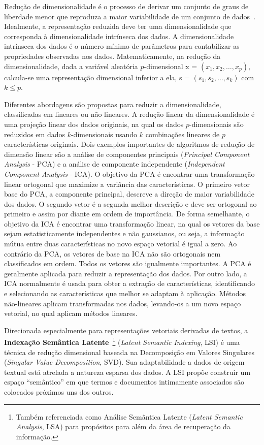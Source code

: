 \documentclass{SBCbookchapter}
\begin{document}
Redução de dimensionalidade é o processo de derivar um conjunto de graus de liberdade menor que reproduza a maior variabilidade de um conjunto de dados~\cite{zhai2014emerging,AndreoniLopez2019}. Idealmente, a representação reduzida deve ter uma dimensionalidade que corresponda à dimensionalidade intrínseca dos dados. A dimensionalidade intrínseca dos dados é o número mínimo de parâmetros para contabilizar as propriedades observadas nos dados. Matematicamente, na redução da dimensionalidade, dada a variável aleatória $p$-dimensional x = $ (x_1, x_2, \ldots, x_p) $, calcula-se uma representação dimensional inferior a ela, s = $ (s_1, s_2, \ldots, s_k) $ com $ k \leq p $.

Diferentes abordagens são propostas para reduzir a dimensionalidade, classificadas em lineares ou não lineares. A redução linear da dimensionalidade é uma projeção linear dos dados originais, na qual os dados $p$-dimensionais são reduzidos em dados $k$-dimensionais usando $k$ combinações lineares de $p$ características originais. Dois exemplos importantes de algoritmos de redução de dimensão linear são a análise de componentes principais (\textit{Principal Component Analysis} - PCA) e a análise de componente independente (\textit{Independent Component Analysis} - ICA). O objetivo da PCA é encontrar uma transformação linear ortogonal que maximize a variância das características. O primeiro vetor base do PCA, a componente principal, descreve a direção de maior variabilidade dos dados. O segundo vetor é a segunda melhor descrição e deve ser ortogonal ao primeiro e assim por diante em ordem de importância. De forma semelhante, o objetivo da ICA é encontrar uma transformação linear, na qual os vetores da base sejam estatisticamente independentes e não gaussianos, ou seja, a informação mútua entre duas características no novo espaço vetorial é igual a zero. Ao contrário da PCA, os vetores de base na ICA não são ortogonais nem classificados em ordem. Todos os vetores são igualmente importantes. A PCA é geralmente aplicada para reduzir a representação dos dados. Por outro lado, a ICA normalmente é usada para obter a extração de características, identificando e selecionando as características que melhor se adaptam à aplicação. Métodos não-lineares aplicam transformadas nos dados, levando-os a um novo espaço vetorial, no qual aplicam métodos lineares.

Direcionada especialmente para representações vetoriais derivadas de textos, a \textbf{Indexação Semântica Latente}~\footnote{Também referenciada como Análise Semântica Latente (\textit{Latent Semantic Analysis}, LSA) para propósitos para além da área de recuperação da informação.} (\textit{Latent Semantic Indexing}, LSI) é uma técnica de redução dimensional baseada na Decomposição em Valores Singulares (\textit{Singular Value Decomposition}, SVD). Sua adaptabilidade a dados de origem textual está atrelada a natureza esparsa dos dados. A LSI propõe construir um espaço ``semântico'' em que termos e documentos intimamente associados são colocados próximos uns dos outros. 
\end{document}

